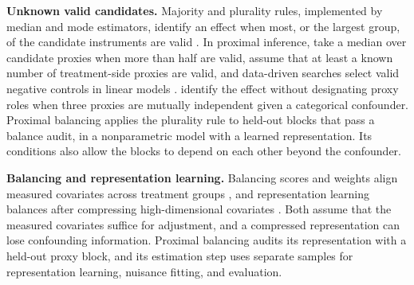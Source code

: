\textbf{Unknown valid candidates.} Majority and plurality rules, implemented by median and mode estimators, identify an effect when most, or the largest group, of the candidate instruments are valid \citep{kang2016instrumental,bowden2016consistent,hartwig2017robust,guo2018confidence}. In proximal inference, \citet{rakshit2025adaptive} take a median over candidate proxies when more than half are valid, \citet{yu2025fortified} assume that at least a known number of treatment-side proxies are valid, and data-driven searches select valid negative controls in linear models \citep{kummerfeld2024data,xie2024automating}. \citet{saha2026causal} identify the effect without designating proxy roles when three proxies are mutually independent given a categorical confounder. Proximal balancing applies the plurality rule to held-out blocks that pass a balance audit, in a nonparametric model with a learned representation. Its conditions also allow the blocks to depend on each other beyond the confounder.

\textbf{Balancing and representation learning.} Balancing scores and weights align measured covariates across treatment groups \citep{rosenbaum1983central,hainmueller2012entropy,imai2014covariate}, and representation learning balances after compressing high-dimensional covariates \citep{shalit2017estimating}. Both assume that the measured covariates suffice for adjustment, and a compressed representation can lose confounding information. Proximal balancing audits its representation with a held-out proxy block, and its estimation step uses separate samples for representation learning, nuisance fitting, and evaluation.
